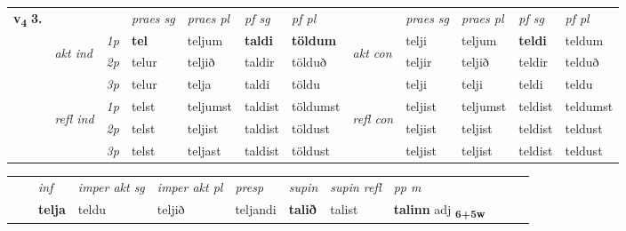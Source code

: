 \begin{tabular}{llllllllllll} \toprule
\multirow{4}{*}{{{\textbf{v{\textsubscript{4}}} \Large{\textbf{3.}}}}}  & &   &  \textit{praes sg}  & \textit{praes pl}  &\textit{ pf sg} & \textit{pf pl} &  &  \textit{praes sg}  & \textit{praes pl}  & \textit{pf sg} & \textit{pf pl } \\*
	\cmidrule{4-7} \cmidrule{9-12}
 & \multirow{3}{*}{\begin{turn}{90}\textit{akt ind}\end{turn}} & {\textit{1p}} & \textbf{tel} & teljum    & \textbf{taldi} & \textbf{töldum} & \multirow{3}{*}{\begin{turn}{90}\textit{akt con}\end{turn}} &telji & teljum & \textbf{teldi} & teldum\\*
& &  {\textit{2p}} &  telur  & teljið   & taldir & tölduð & & teljir & teljið & teldir & telduð \\*
& &  {\textit{3p}} & telur & telja   & taldi & töldu & & telji & telji& teldi & teldu  \\*
\cmidrule{4-7} \cmidrule{9-12}
 &\multirow{3}{*}{\begin{turn}{90}\textit{refl ind}\end{turn}} & {\textit{1p}} & telst & teljumst    & taldist & töldumst & \multirow{3}{*}{\begin{turn}{90}\textit{refl con}\end{turn}}  &teljist & teljumst & teldist & teldumst\\*
 &&  {\textit{2p}} &  telst  & teljist   & taldist & töldust & &teljist & teljist & teldist & teldust \\*
& &  {\textit{3p}} & telst & teljast   & taldist & töldust & & teljist & teljist& teldist & teldust  \\*
\cmidrule{4-7} \cmidrule{9-12}
\end{tabular}


\begin{tabular}{llllllllllll}
 & & \textit{inf} & \textit{imper akt sg} & \textit{imper akt pl}   & \textit{presp} & \textit{supin} & \textit{supin refl} & \textit{pp m}     \\*
  & & \textbf{telja} & teldu  & teljið   & teljandi &  \textbf{talið} & talist & \textbf{talinn} adj \textbf{\textsubscript{6+5w}} \\*
\cmidrule{1-12}
\end{tabular}



